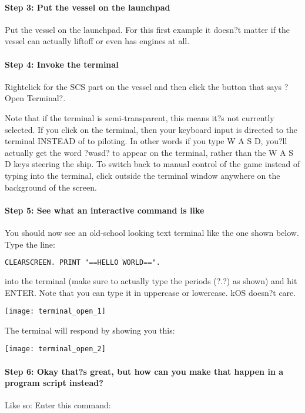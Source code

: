 \paragraph{Step 3: Put the vessel on the launchpad}
Put the vessel on the launchpad. For this first example it doesn?t matter if the vessel can actually liftoff or even has engines at all.

\paragraph{Step 4: Invoke the terminal}
Rightclick for the SCS part on the vessel and then click the button that says ?Open Terminal?.

Note that if the terminal is semi-transparent, this means it?s not currently selected. If you click on the terminal, then your keyboard input is directed to the terminal INSTEAD of to piloting. In other words if you type W A S D, you?ll actually get the word ?wasd? to appear on the terminal, rather than the W A S D keys steering the ship. To switch back to manual control of the game instead of typing into the terminal, click outside the terminal window anywhere on the background of the screen.

\paragraph{Step 5: See what an interactive command is like}
You should now see an old-school looking text terminal like the one shown below. Type the line:

\begin{lstlisting}[frame=single,language=XML]
CLEARSCREEN. PRINT "==HELLO WORLD==".
\end{lstlisting} 

into the terminal (make sure to actually type the periods (?.?) as shown) and hit ENTER. Note that you can type it in uppercase or lowercase. kOS doesn?t care.

\begin{center}
\texttt{[image: terminal\_open\_1]}
\end{center}

The terminal will respond by showing you this:

\begin{center}
\texttt{[image: terminal\_open\_2]}
\end{center}

\paragraph{Step 6: Okay that?s great, but how can you make that happen in a program script instead?}
Like so: Enter this command:


